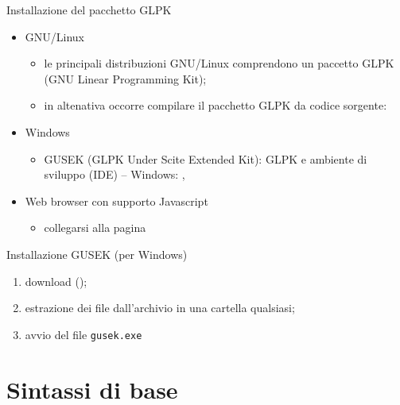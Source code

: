 \documentclass{beamer}
\begin{document}
\begin{frame}{Installazione del pacchetto GLPK}
   \begin{itemize}
   \item GNU/Linux
	   \begin{itemize}
	   	\item le principali distribuzioni GNU/Linux comprendono un paccetto GLPK (GNU Linear Programming Kit);
	   	\item in altenativa occorre compilare il pacchetto GLPK da \alert{codice sorgente}:
    \href{http://www.gnu.org/software/glpk/glpk.html}{}
   \end{itemize}

   \item Windows
   \begin{itemize}
   	   \item GUSEK (GLPK Under Scite Extended Kit): GLPK e ambiente di sviluppo (IDE) -- Windows:
   \href{http://gusek.sourceforge.net/}{},
   \end{itemize}

   \item Web browser con supporto Javascript
	\begin{itemize}
	\item collegarsi alla pagina \href{http://www3.nd.edu/~jeff/mathprog/mathprog.html}{}
	\end{itemize}
\end{itemize} 
\end{frame}

\begin{frame}{Installazione GUSEK (per Windows)}
\begin{enumerate}
\item download (\href{http://gusek.sourceforge.net/}{});
\item estrazione dei file dall'archivio in una cartella qualsiasi;
\item avvio del file \texttt{gusek.exe}
\end{enumerate}
\end{frame}

\section{Sintassi di base}
\end{document}
